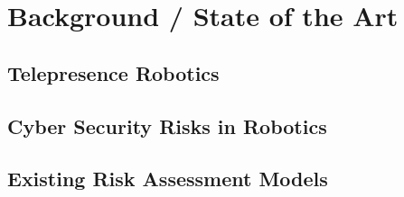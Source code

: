 
\newpage
\section{Background / State of the Art}



\subsection{Telepresence Robotics}


\subsection{Cyber Security Risks in Robotics}


\subsection{Existing Risk Assessment Models}


